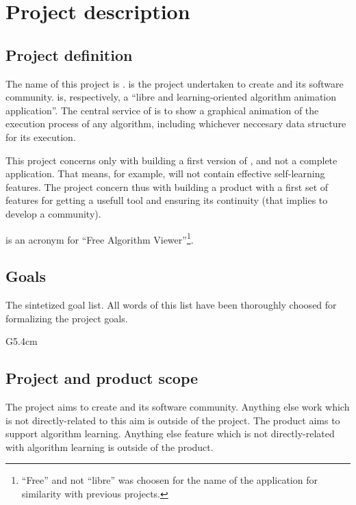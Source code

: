 \documentclass[twocolumn]{article}
\begin{document}
\section{Project description}
\subsection{Project definition}
The name of this project is \favp. \favp is the project undertaken to
create \fav and its software community. \fav is, respectively, a
``libre and learning-oriented algorithm animation application''. The
central service of \fav is to show a graphical animation of the execution
process of any algorithm, including whichever neccesary data structure
for its execution.

This project concerns only with building a first version of \fav, and
not a complete application. That means, for example, \fav will not
contain effective self-learning features. The project concern thus
with building a product with a first set of features for getting a
usefull tool and ensuring its continuity (that implies to develop a
community).

\fav is an acronym for ``Free Algorithm Viewer''\footnote{``Free'' and
not ``libre'' was choosen for the name of the application for similarity
with previous projects.}.

\subsection{Goals}
\label{sec:goals}
The sintetized \favp goal list. All words of this list
have been thoroughly choosed for formalizing the project goals.

\begin{condlist}{G}{5.4cm}
\end{condlist}

\subsection{Project and product scope}
The project aims to create \fav and its software community. Anything
else work which is not directly-related to this aim is outside of the
project. The product aims to support algorithm learning. Anything else
feature which is not directly-related with algorithm learning is
outside of the product.
\end{document}
